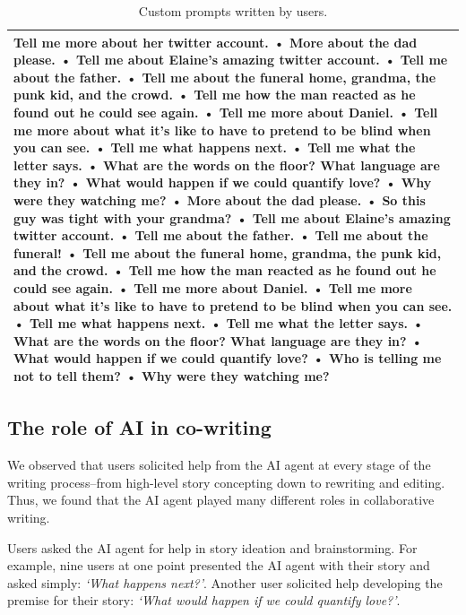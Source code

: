 \begin{table}
\caption{Custom prompts written by users.}
\label{tab:custom_prompts}
\small
\begin{tabular}{p{}}
\toprule
Tell me more about her twitter account. • More about the dad please. • Tell me about Elaine's amazing twitter account. • Tell me about the father. • Tell me about the funeral home, grandma, the punk kid, and the crowd. • Tell me how the man reacted as he found out he could see again. • Tell me more about Daniel. • Tell me more about what it's like to have to pretend to be blind when you can see. • Tell me what happens next. • Tell me what the letter says. • What are the words on the floor? What language are they in? • What would happen if we could quantify love? • Why were they watching me? • More about the dad please. • So this guy was tight with your grandma? • Tell me about Elaine's amazing twitter account. • Tell me about the father. • Tell me about the funeral! • Tell me about the funeral home, grandma, the punk kid, and the crowd. • Tell me how the man reacted as he found out he could see again. • Tell me more about Daniel. • Tell me more about what it's like to have to pretend to be blind when you can see. • Tell me what happens next. • Tell me what the letter says. • What are the words on the floor? What language are they in? • What would happen if we could quantify love? • Who is telling me not to tell them? • Why were they watching me? \\
\bottomrule
\end{tabular}
\end{table}

\subsection{The role of AI in co-writing}
\label{sec:results-idea-generator}

We observed that users solicited help from the AI agent at every stage of the writing process--from high-level story concepting down to rewriting and editing.
Thus, we found that the AI agent played many different roles in collaborative writing.

Users asked the AI agent for help in story ideation and brainstorming.
For example, nine users at one point presented the AI agent with their story and asked simply: \textit{`What happens next?'}.
Another user solicited help developing the premise for their story: \textit{`What would happen if we could quantify love?'}. 

